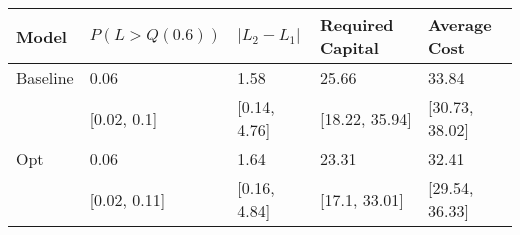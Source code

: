 \begin{tabular}{lllll}
\toprule
   Model & $P(L > Q(0.6))$ & $|L_2 - L_1|$ & Required Capital &   Average Cost \\
\midrule
Baseline &            0.06 &          1.58 &            25.66 &          33.84 \\
         &     [0.02, 0.1] &  [0.14, 4.76] &   [18.22, 35.94] & [30.73, 38.02] \\
     Opt &            0.06 &          1.64 &            23.31 &          32.41 \\
         &    [0.02, 0.11] &  [0.16, 4.84] &    [17.1, 33.01] & [29.54, 36.33] \\
\bottomrule
\end{tabular}

